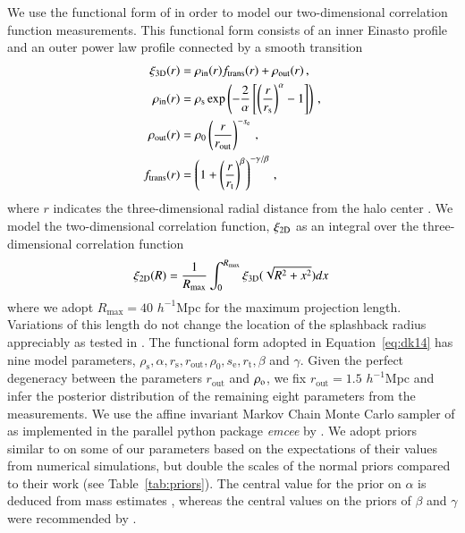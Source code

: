 \documentclass[iop, apjl, twocolappendix, numberedappendix]{emulateapj}
\begin{document}
We use the functional form of \citet{diemer2014dependence} in order
to model our two-dimensional correlation function measurements. This
functional form consists of an inner Einasto profile and an outer
power law profile connected by a smooth transition
\begin{align}
\xi_{\rm 3D}(r) &= \rho_{\mathrm{in}}(r)f_{\mathrm{trans}}(r) + \rho_{\mathrm{out}}(r)\,, \\
\rho_{\mathrm{in}}(r)&=\rho_{\mathrm{s}}\exp\left( -\frac{2}{\alpha}\left[ \left( \frac{r}{r_{\mathrm{s}}}\right)^{\alpha}-1 \right] \right)\,,\\
\rho_{\mathrm{out}}(r)&=\rho_{\mathrm{0}}\left( \frac{r}{r_{\mathrm{out}}}\right)^{-s_{\mathrm{e}}} \,,\label{eq:model} \\
f_{\mathrm{trans}}(r)&=\left( 1+\left( \frac{r}{r_{\mathrm{t}}} \right)^{\beta} \right)^{-\gamma/ \beta}\,,
\label{eq:dk14}
\end{align}
where $r$ indicates the three-dimensional radial distance from the
halo center \citep{diemer2014dependence}. We model the
two-dimensional correlation function, $\xi_{\rm 2D}$ as an integral
over the three-dimensional correlation function
\begin{equation}
\xi_{\rm 2D}(R)=\frac{1}{R_{\rm max}}\int^{R_{\mathrm{max}}}_0 \xi_{\rm 3D}(\sqrt{R^2+x^2}) dx \,
\label{eq:surface}
\end{equation}
where we adopt $R_{\mathrm{max}}=40$ $h^{-1}$Mpc for the maximum projection
length. Variations of this length do not change the location of the
splashback radius appreciably as tested in
\citet{more2016detection}. The functional form adopted in
Equation~\ref{eq:dk14} has nine model parameters,
$\rho_{\mathrm{s}}, \alpha, r_{\mathrm{s}}, r_{\mathrm{out}},
\rho_{\mathrm{0}}, s_{\mathrm{e}}, r_{\mathrm{t}}, \beta$ and
$\gamma$. Given the perfect degeneracy between the parameters
$r_{\mathrm{out}}$ and $\rho_{\rm o}$, we fix $r_{\mathrm{out}}=1.5$ $
h^{-1}$Mpc and infer the posterior distribution of the remaining
eight parameters from the measurements. We use the affine invariant
Markov Chain Monte Carlo sampler of \citet{goodman2010ensemble} as
implemented in the parallel python package {\it emcee} by
\citet{foreman2013emcee}. We adopt priors similar to
\citet{more2016detection} on some of our parameters based on the
expectations of their values from numerical simulations, but double
the scales of the normal priors compared to their work (see
Table~\ref{tab:priors}). The central value for the prior on $\alpha$
is deduced from mass estimates \citep{gao2008redshift}, whereas the
central values on the priors of $\beta$ and $\gamma$ were
recommended by \citet{diemer2014dependence}.
\end{document}
